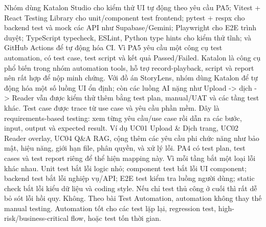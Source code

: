 {}\markdownRendererSectionBegin
{}\markdownRendererInterblockSeparator
{}Nhóm dùng Katalon Studio cho kiểm thử UI tự động theo yêu cầu PA5; Vitest + React Testing Library cho unit/component test frontend; pytest + respx cho backend test và mock các API như Supabase/Gemini; Playwright cho E2E trình duyệt; TypeScript typecheck, ESLint, Python type hints cho kiểm thử tĩnh; và GitHub Actions để tự động hóa CI.\markdownRendererInterblockSeparator
{}
\markdownRendererSectionEnd \markdownRendererSectionBegin
{}\markdownRendererInterblockSeparator
{}Vì PA5 yêu cầu một công cụ test automation, có test case, test script và kết quả Passed/Failed. Katalon là công cụ phổ biến trong nhóm automation tools, hỗ trợ record-playback, script và report nên rất hợp để nộp minh chứng.\markdownRendererParagraphSeparator
{}Với đồ án StoryLens, nhóm dùng Katalon để tự động hóa một số luồng UI ổn định; còn các luồng AI nặng như Upload -> dịch -> Reader vẫn được kiểm thử thêm bằng test plan, manual/UAT và các tầng test khác.\markdownRendererInterblockSeparator
{}
\markdownRendererSectionEnd \markdownRendererSectionBegin
{}\markdownRendererInterblockSeparator
{}Test case được trace từ use case và yêu cầu phần mềm. Đây là requirements-based testing: xem từng yêu cầu/use case rồi dẫn ra các bước, input, output và expected result.\markdownRendererParagraphSeparator
{}Ví dụ UC01 Upload & Dịch trang, UC02 Reader overlay, UC04 Q&A RAG, cộng thêm các yêu cầu phi chức năng như bảo mật, hiệu năng, giới hạn file, phân quyền, và xử lý lỗi. PA4 có test plan, test cases và test report riêng để thể hiện mapping này.\markdownRendererInterblockSeparator
{}
\markdownRendererSectionEnd \markdownRendererSectionBegin
{}\markdownRendererInterblockSeparator
{}Vì mỗi tầng bắt một loại lỗi khác nhau. Unit test bắt lỗi logic nhỏ; component test bắt lỗi UI component; backend test bắt lỗi nghiệp vụ/API; E2E test kiểm tra luồng người dùng; static check bắt lỗi kiểu dữ liệu và coding style.\markdownRendererParagraphSeparator
{}Nếu chỉ test thủ công ở cuối thì rất dễ bỏ sót lỗi hồi quy.\markdownRendererInterblockSeparator
{}
\markdownRendererSectionEnd \markdownRendererSectionBegin
{}\markdownRendererInterblockSeparator
{}Không. Theo bài Test Automation, automation không thay thế manual testing. Automation tốt cho các test lặp lại, regression test, high-risk/business-critical flow, hoặc test tốn thời gian.\markdownRendererParagraphSeparator

